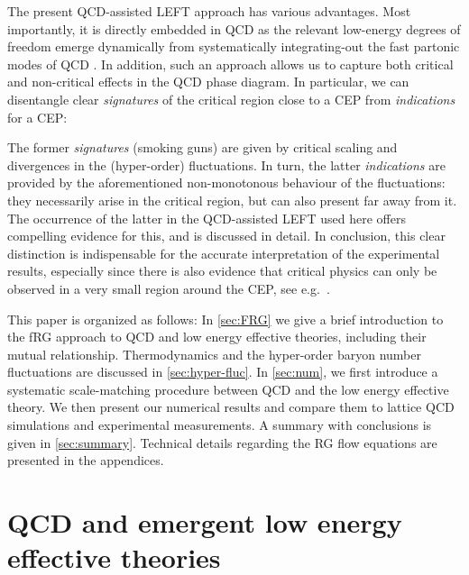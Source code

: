 \documentclass[%
reprint,
superscriptaddress,
showpacs,preprintnumbers,
amsmath,amssymb,
aps,
prd,
]{revtex4-1}
\begin{document}
The present QCD-assisted LEFT approach has various advantages. Most importantly, it is directly embedded in QCD as the relevant low-energy degrees of freedom emerge dynamically from systematically integrating-out the fast partonic modes of QCD \cite{Mitter:2014wpa, Braun:2014ata, Rennecke:2015eba, Cyrol:2017ewj, Fu:2019hdw}. In addition, such an approach allows us to capture both critical and non-critical effects in the QCD phase diagram. In particular, we can disentangle clear \textit{signatures} of the critical region close to a CEP from \textit{indications} for a CEP: 
	
The former \textit{signatures} (smoking guns) are given by critical scaling and divergences in the (hyper-order) fluctuations. In turn, the latter \textit{indications} are provided by the aforementioned non-monotonous behaviour of the fluctuations: they necessarily arise in the critical region, but can also present far away from it. The occurrence of the latter in the QCD-assisted LEFT used here offers compelling evidence for this, and is discussed in detail. In conclusion, this clear distinction is indispensable for the accurate interpretation of the experimental results, especially since there is also evidence that critical physics can only be observed in a very small region around the CEP, see e.g.\ \cite{Schaefer:2006ds}. 
	
This paper is organized as follows: In \autoref{sec:FRG} we give a brief introduction to the fRG approach to QCD and low energy effective theories, including their mutual relationship. Thermodynamics and the hyper-order baryon number fluctuations are discussed in \autoref{sec:hyper-fluc}. In \autoref{sec:num}, we first introduce a systematic scale-matching procedure between QCD and the low energy effective theory. We then present our numerical results and compare them to lattice QCD simulations and experimental measurements. A summary with conclusions is given in \autoref{sec:summary}. Technical details regarding the RG flow equations are presented in the appendices.
	
	
	
	
	
\section{QCD and emergent low energy effective theories}
\label{sec:FRG}
	
\end{document}
